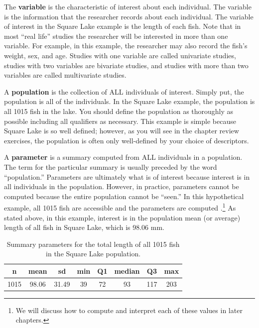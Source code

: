 \documentclass[10pt,openany]{book}\usepackage[]{graphicx}\usepackage[]{color}
\begin{document}

\vspace{-12pt}

The \textbf{variable} is the characteristic of interest about each individual.  The variable is the information that the researcher records about each individual. The variable of interest in the Square Lake example is the length of each fish. Note that in most ``real life'' studies the researcher will be interested in more than one variable.  For example, in this example, the researcher may also record the fish's weight, sex, and age.  Studies with one variable are called univariate studies, studies with two variables are bivariate studies, and studies with more than two variables are called multivariate studies.


A \textbf{population} is the collection of ALL individuals of interest.  Simply put, the population is all of the individuals.  In the Square Lake example, the population is all 1015 fish in the lake.  You should define the population as thoroughly as possible including all qualifiers as necessary.  This example is simple because Square Lake is so well defined; however, as you will see in the chapter review exercises, the population is often only well-defined by your choice of descriptors.


A \textbf{parameter} is a summary computed from ALL individuals in a population.  The term for the particular summary is usually preceded by the word ``population.''  Parameters are ultimately what is of interest because interest is in all individuals in the population.  However, in practice, parameters cannot be computed because the entire population cannot be ``seen.''  In this hypothetical example, all 1015 fish are accessible and the parameters are computed .\footnote{We will discuss how to compute and interpret each of these values in later chapters.}  As stated above, in this example, interest is in the population mean (or average) length of all fish in Square Lake, which is 98.06 mm.

\begin{table}[ht]
\centering
\caption{Summary parameters for the total length of all 1015 fish in the Square Lake population.} 
\label{tab:SquareLakePopn}
\begin{tabular}{cccccccc}
 n & mean & sd & min & Q1 & median & Q3 & max \\ 
  \hline
1015 & 98.06 & 31.49 & 39 & 72 & 93 & 117 & 203 \\ 
   \hline
\end{tabular}
\end{table}
\end{document}
